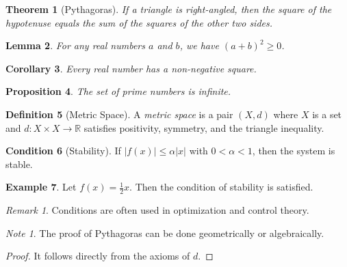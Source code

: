 \documentclass[twocolumn]{article}
\newtheorem{theorem}{Theorem}[section]
\newtheorem{lemma}[theorem]{Lemma}
\newtheorem{corollary}[theorem]{Corollary}
\newtheorem{proposition}[theorem]{Proposition}
\theoremstyle{definition}
\newtheorem{definition}[theorem]{Definition}
\newtheorem{condition}[theorem]{Condition}
\newtheorem{example}[theorem]{Example}
\theoremstyle{remark}
\newtheorem*{remark}{Remark}
\newtheorem*{note}{Note}
\begin{document}
\begin{theorem}[Pythagoras] %
\label{thm:pythagoras}
If a triangle is right-angled, then the square of the hypotenuse equals the sum of the squares of the other two sides.
\end{theorem}

\begin{lemma} %
\label{lem:square}
For any real numbers $a$ and $b$, we have $(a+b)^2 \geq 0$.
\end{lemma}

\begin{corollary} %
\label{cor:nonnegative}
Every real number has a non-negative square.
\end{corollary}

\begin{proposition} %
\label{prop:primes}
The set of prime numbers is infinite.
\end{proposition}

\begin{definition}[Metric Space] %
\label{def:metric}
A \emph{metric space} is a pair $(X,d)$ where $X$ is a set and $d:X\times X\to\mathbb{R}$ satisfies positivity, symmetry, and the triangle inequality.
\end{definition}

\begin{condition}[Stability] %
\label{cond:stability}
If $|f(x)| \leq \alpha|x|$ with $0<\alpha<1$, then the system is stable.
\end{condition}

\begin{example} %
\label{ex:stability}
Let $f(x)=\tfrac{1}{2}x$. Then the condition of stability is satisfied.
\end{example}

\begin{remark} %
\label{rem:control}
Conditions are often used in optimization and control theory.
\end{remark}

\begin{note} %
\label{note:pythagoras}
The proof of Pythagoras can be done geometrically or algebraically.
\end{note}

\begin{proof} %
It follows directly from the axioms of $d$. 
\end{proof}



\end{document}
